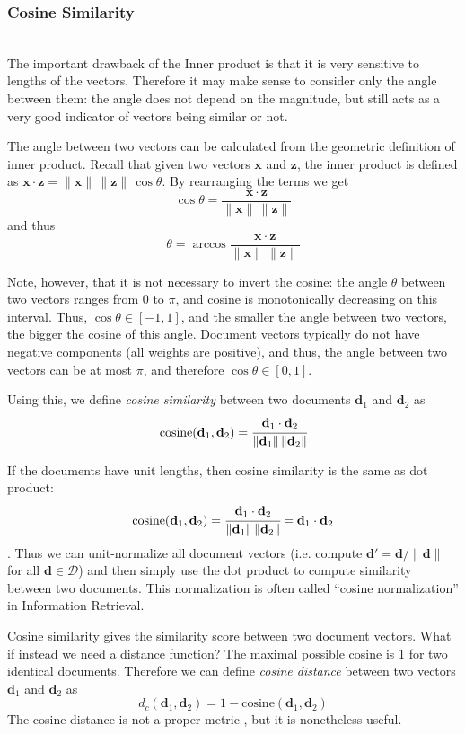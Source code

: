 \subsubsection{Cosine Similarity} \ \\

The important drawback of the Inner product is that it is very sensitive to
lengths of the vectors. Therefore it may make sense to consider only the angle
between them: the angle does not depend on the magnitude, but still
acts as a very good indicator of vectors being similar or not.

The angle between two vectors can be calculated from the geometric
definition of inner product. Recall that given
two vectors $\mathbf x$ and $\mathbf z$, the inner product is defined as
$\mathbf x \cdot \mathbf z = \|\mathbf x \| \, \| \mathbf z \| \, \cos \theta$.
By rearranging the terms we get
$$\cos \theta = \frac{\mathbf x \cdot \mathbf z}{\|\mathbf x \| \, \| \mathbf z \|}$$
and thus
$$\theta = \arccos \frac{\mathbf x \cdot \mathbf z}{\|\mathbf x \| \, \| \mathbf z \|}$$

Note, however, that it is not necessary to invert the cosine: the angle $\theta$
between two vectors ranges from $0$ to $\pi$, and cosine is monotonically
decreasing on this interval. Thus, $\cos \theta \in [-1, 1]$, and the smaller
the angle between two vectors, the bigger the cosine of this angle.
Document vectors typically do not have negative components (all weights are
positive), and thus, the angle between two vectors can be at most $\pi$,
and therefore $\cos \theta \in [0, 1]$.

Using this, we define \emph{cosine similarity} between two documents $\mathbf d_1$ and
$\mathbf d_2$ as
$$\text{cosine}(\mathbf d_1, \mathbf d_2) = \cfrac{\mathbf d_1 \cdot \mathbf d_2}{\|\mathbf d_1 \| \, \| \mathbf d_2 \|}$$

If the documents have unit lengths, then cosine similarity is the same as
dot product: $$\text{cosine}(\mathbf d_1, \mathbf d_2) = \cfrac{\mathbf d_1 \cdot \mathbf d_2}{\|\mathbf d_1 \| \, \| \mathbf d_2 \|} = \mathbf d_1 \cdot \mathbf d_2$$.
Thus we can unit-normalize all document vectors
(i.e. compute $\mathbf d' = \mathbf d / \| \mathbf d \|$ for all
$\mathbf d \in \mathcal D$) and then simply use the dot product to compute
similarity between two documents. This normalization is often
called ``cosine normalization'' in Information Retrieval.


Cosine similarity gives the similarity score between two document vectors.
What if instead we need a distance function? The maximal possible cosine
is 1 for two identical documents. Therefore we can define \emph{cosine distance}
between two vectors $\mathbf d_1$ and $\mathbf d_2$ as
$$d_c(\mathbf d_1, \mathbf d_2) = 1 - \text{cosine}(\mathbf d_1, \mathbf d_2)$$
The cosine distance is not a proper metric \cite{korenius2007principal},
but it is nonetheless useful.


